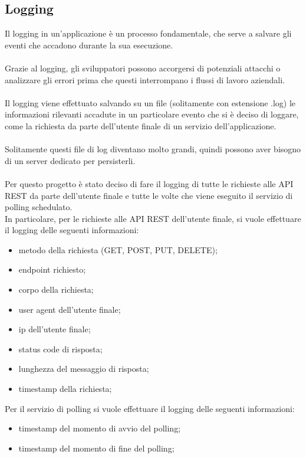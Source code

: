 \subsection{Logging}
Il logging in un'applicazione è un processo fondamentale, che serve a salvare gli eventi che accadono durante
la sua esecuzione.
\\\\
Grazie al logging, gli sviluppatori possono accorgersi di potenziali attacchi o analizzare gli
errori prima che questi interrompano i flussi di lavoro aziendali.
\\\\
Il logging viene effettuato salvando su un file (solitamente con estensione .log) le informazioni rilevanti
accadute in un particolare evento che si è deciso di loggare, come la richiesta da parte
dell'utente finale di un servizio dell'applicazione.
\\\\
Solitamente questi file di log diventano molto grandi, quindi possono aver bisogno di un server dedicato per 
persisterli.
\\\\
Per questo progetto è stato deciso di fare il logging di tutte le richieste alle \gls{API} \gls{REST} da parte dell'utente
finale e tutte le volte che viene eseguito il servizio di polling schedulato.
\\
In particolare, per le richieste alle \gls{API} \gls{REST} dell'utente finale, si vuole effettuare il logging delle seguenti 
informazioni:
\begin{itemize}
    \item metodo della richiesta (GET, POST, PUT, DELETE);
    \item \gls{endpoint} richiesto;
    \item corpo della richiesta;
    \item user agent dell'utente finale;
    \item ip dell'utente finale;
    \item status code di risposta;
    \item lunghezza del messaggio di risposta;
    \item timestamp della richiesta;
\end{itemize}
\leavevmode\newline
Per il servizio di polling si vuole effettuare il logging delle seguenti informazioni:
\begin{itemize}
    \item timestamp del momento di avvio del polling;
    \item timestamp del momento di fine del polling;
\end{itemize}
